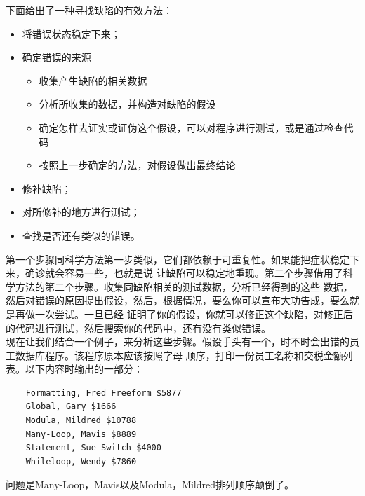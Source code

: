 \documentclass{article}
\begin{document}
下面给出了一种寻找缺陷的有效方法：
\begin{itemize}
    \item 将错误状态稳定下来；
    \item 确定错误的来源
    \begin{itemize}
        \item 收集产生缺陷的相关数据
        \item 分析所收集的数据，并构造对缺陷的假设
        \item 确定怎样去证实或证伪这个假设，可以对程序进行测试，或是通过检查代码
        \item 按照上一步确定的方法，对假设做出最终结论
    \end{itemize}
    \item 修补缺陷；
    \item 对所修补的地方进行测试；
    \item 查找是否还有类似的错误。
\end{itemize}
第一个步骤同科学方法第一步类似，它们都依赖于可重复性。如果能把症状稳定下来，确诊就会容易一些，也就是说
让缺陷可以稳定地重现。第二个步骤借用了科学方法的第二个步骤。收集同缺陷相关的测试数据，分析已经得到的这些
数据，然后对错误的原因提出假设，然后，根据情况，要么你可以宣布大功告成，要么就是再做一次尝试。一旦已经
证明了你的假设，你就可以修正这个缺陷，对修正后的代码进行测试，然后搜索你的代码中，还有没有类似错误。\\
现在让我们结合一个例子，来分析这些步骤。假设手头有一个，时不时会出错的员工数据库程序。该程序原本应该按照字母
顺序，打印一份员工名称和交税金额列表。以下内容时输出的一部分：
\begin{lstlisting}
    Formatting, Fred Freeform $5877
    Global, Gary $1666
    Modula, Mildred $10788
    Many-Loop, Mavis $8889
    Statement, Sue Switch $4000
    Whileloop, Wendy $7860
\end{lstlisting}
问题是Many-Loop，Mavis以及Modula，Mildred排列顺序颠倒了。
\end{document}

